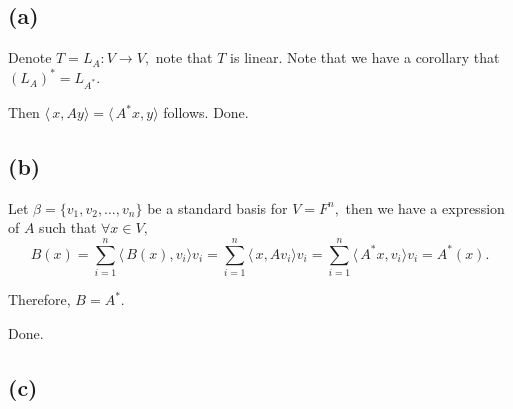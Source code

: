 \documentclass[12pt]{article}%
\begin{document}
\subsection{(a)}
Denote $T=L_{A}:V \to V,$ note that $T$ is linear. Note that we have a corollary that $(L_{A})^{*}=L_{A^{*}}.$

Then $\langle\,x,Ay\rangle=\langle\,A^{*}x,y\rangle$ follows. Done.

\subsection{(b)}
Let $\beta=\{v_1,v_2,\dots, v_n\}$ be a standard basis for $V=F^{n},$ then we have a expression of $A$ such that $\forall x \in V,$
$$B(x)=\sum_{i=1}^{n}\langle\,B(x),v_i\rangle v_i=\sum_{i=1}^{n}\langle\,x,Av_i\rangle v_i=\sum_{i=1}^{n}\langle\,A^{*}x,v_i\rangle v_i=A^{*}(x).$$

Therefore, $B=A^{*}.$

Done.

\subsection{(c)}
\end{document}
